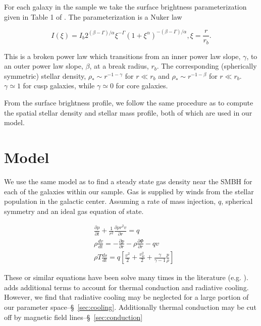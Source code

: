 \documentclass[usenatbib,fleqn]{mn2e}
\newcommand{\rb}{r_b}
\newcommand{\dxdy}[2]{\frac{\partial #1}{\partial #2} }
\newcommand{\drhodt}{\dxdy{\rho}{t}}
\newcommand{\dpdr}{\dxdy{p}{r}}
\newcommand{\dphidr}{\dxdy{\Phi}{r}}
\newcommand{\ke}{\frac{v^2}{2}}
\newcommand{\kew}{\frac{v_w^2}{2}}
\newcommand{\gammaf}{\frac{\gamma}{\gamma-1}}
\newcommand{\cs}{\frac{p}{\rho}}
\newcommand{\rhostar}{\rho_*}
\begin{document}
For each galaxy in the sample we take the surface brightness parameterization given in Table 1 of  . The parameterization is a Nuker law

\begin{equation}
I(\xi)=I_b 2^{(\beta-\Gamma)/\alpha} \xi^{-\Gamma} (1+\xi^\alpha)^{-(\beta-\Gamma)/\alpha}, \xi=\frac{r}{r_b}.
\end{equation}

This is a broken power law which transitions from an inner power law slope, $\gamma$, to an outer power law slope, $\beta$, at a break radius, $\rb$.  The corresponding (spherically symmetric) stellar density, $\rhostar\sim r^{-1-\gamma}$ for $r \ll \rb$ and  $\rhostar\sim r^{-1-\beta}$ for $r \ll \rb$.  $\gamma\simeq1$ for cusp galaxies, while $\gamma\simeq0$ for core galaxies.

From the surface brightness profile, we follow the same procedure as  to compute the spatial stellar density and stellar mass profile, both of which are used in our model. 


\section{Model}
\label{sec:model}
We use the same model as \citealt{Quataert:2004a} to find a steady state gas density near the SMBH for each of the galaxies within our sample.  Gas is supplied by winds from the stellar population in the galactic center. Assuming a rate of mass injection, $q$, spherical symmetry and an ideal gas equation of state. 

\begin{align}
&\drhodt+\frac{1}{r^2}\dxdy{\rho r^2 v}{r}=q\\
&\rho \frac{dv}{dt}=-\dpdr-\rho \dphidr-q v\\
&\rho T \frac{ds}{dt}=q\left[\ke+\kew+\gammaf \cs \right]
\end{align}

These or similar equations have been solve many times in the literature (e.g. \citealt{HolzerAxford:1970a,Quataert:2004a,De-ColleGuillochon+:2012a,ShcherbakovWong+:2014a}). \citealt{ShcherbakovWong+:2014a} adds additional terms to account for thermal conduction and radiative cooling. However, we find that radiative cooling may be neglected for a large portion of our parameter space--\S~\ref{sec:cooling}.  Additionally thermal conduction may be cut off by magnetic field lines--\S~\ref{sec:conduction}
\end{document}
